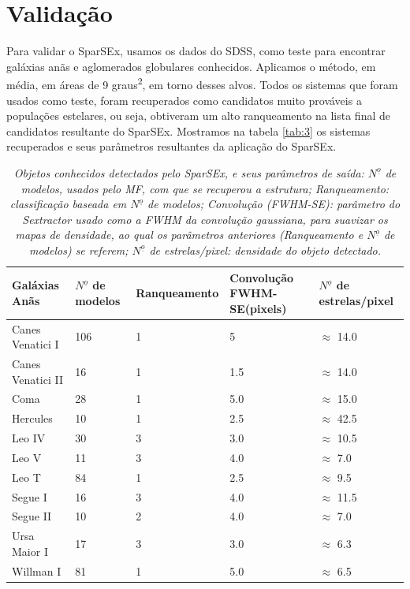 \documentclass[
	12pt,				%
	openany,			%
	oneside,			%
	a4paper,			%
	english,			%
	brazil				%
	]{abntex2}
\begin{document}
\chapter{Validação}
\label{cha:validacao}
Para validar o SparSEx, usamos os dados do SDSS, como teste para encontrar galáxias anãs e aglomerados globulares conhecidos. Aplicamos o método, em média, em áreas de 9 graus\textsuperscript{2}, em torno desses alvos. Todos os sistemas que foram usados como teste, foram recuperados como candidatos muito prováveis a populações estelares, ou seja, obtiveram um  alto ranqueamento na lista final de candidatos resultante do SparSEx. Mostramos na tabela \ref{tab:3} os sistemas recuperados e seus parâmetros resultantes da aplicação do SparSEx.

\begin{table}[h]
\caption{\emph{Objetos conhecidos detectados pelo SparSEx, e seus parâmetros de saída: $N^{\underline{o}}$ de modelos, usados pelo MF, com que se recuperou a estrutura; Ranqueamento:  classificação  baseada em $N^{\underline{o}}$ de modelos; Convolução (FWHM-SE): parâmetro do Sextractor usado como a FWHM da convolução gaussiana, para suavizar os mapas de densidade, ao qual os parâmetros anteriores (Ranqueamento e  $N^{\underline{o}}$ de modelos) se referem; $N^{\underline{o}}$ de estrelas/pixel: densidade do objeto detectado.}}
\centering
\begin{tabular}{p{3.0cm}p{2.0cm}p{2.5cm}p{2.8cm}p{2.8cm}}
\hline
Galáxias Anãs & $N^{\underline{o}}$ de modelos & Ranqueamento & Convolução FWHM-SE(pixels) & $N^{\underline{o}}$ de estrelas/pixel  \\
\hline
\hline
Canes Venatici I & 106 & 1 & 5 & $\approx$ 14.0 \\
Canes Venatici II & 16 & 1 & 1.5 & $\approx$ 14.0 \\
Coma & 28 & 1 & 5.0 & $\approx$ 15.0 \\
Hercules & 10 & 1 & 2.5 & $\approx$ 42.5 \\
Leo IV & 30 & 3 & 3.0 & $\approx$ 10.5 \\
Leo V & 11 & 3 & 4.0 & $\approx$ 7.0 \\
Leo T & 84 & 1 & 2.5 & $\approx$ 9.5 \\
Segue I & 16 & 3 & 4.0 & $\approx$ 11.5 \\
Segue II & 10 & 2 & 4.0 & $\approx$ 7.0 \\
Ursa Maior I & 17 & 3 & 3.0 & $\approx$ 6.3 \\
Willman I & 81 & 1 & 5.0 & $\approx$ 6.5 \\

\end{tabular}
\end{table}
\end{document}
